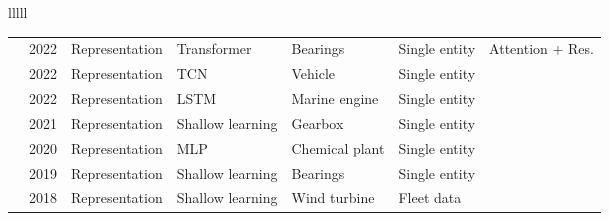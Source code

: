 \begin{landscape}
\begin{longtable}{lllll}
\begin{tabular}{lllllll}
\cite{chiBearingFaultDiagnosis2022} & 2022 & Representation & Transformer & Bearings & Single entity & Attention + Res. \\
\cite{neupaneTemporalAnomalyDetection2022} & 2022 & Representation & TCN & Vehicle & Single entity & \texttimes \\
\cite{velasco-gallegoRADISRealtimeAnomaly2022} & 2022 & Representation & LSTM & Marine engine & Single entity & \texttimes \\
\cite{huNovelVehicleGearbox2021} & 2021 & Representation & Shallow learning & Gearbox & Single entity & \texttimes \\
\cite{kimSemiSupervisedAutoencoderAuxiliary2020} & 2020 & Representation & MLP & Chemical plant & Single entity & \texttimes \\
\cite{songUnsupervisedFaultDiagnosis2019} & 2019 & Representation & Shallow learning & Bearings & Single entity & \texttimes \\
\cite{helsenFleetwideConditionMonitoring2018} & 2018 & Representation & Shallow learning & Wind turbine & Fleet data & \texttimes \\
\bottomrule
\end{tabular}

\end{longtable}
\end{landscape}
